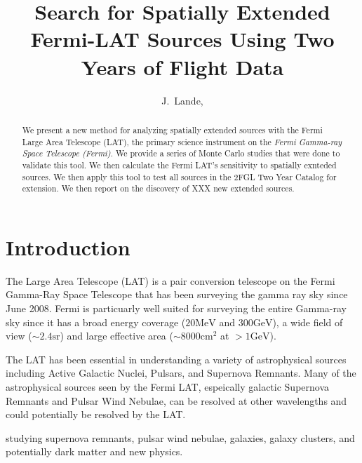 \documentclass[preprint]{aastex}
\newcommand{\mev}{\text{MeV}\xspace}
\newcommand{\gev}{\text{GeV}\xspace}
\newcommand{\sr}{\text{sr}\xspace}
\newcommand{\cm}{\text{cm}\xspace}
\begin{document}
\title{Search for Spatially Extended Fermi-LAT Sources Using Two Years of Flight
Data}

\author{
J.~Lande, 
}


\begin{abstract}
We present a new method for analyzing spatially extended sources with
the Fermi Large Area Telescope (LAT), the primary science instrument
on the {\em Fermi Gamma-ray Space Telescope (Fermi)}.  We provide a
series of Monte Carlo studies that were done to validate this tool.
We then calculate the Fermi LAT's sensitivity to spatially exnteded
sources.
We then apply this tool to test all sources in the 2FGL Two Year Catalog
for extension.\cite{2FGL} We then report on the discovery of XXX new
extended sources.
\end{abstract}

\section{Introduction}


The Large Area Telescope (LAT) is a pair conversion telescope on the
Fermi Gamma-Ray Space Telescope that has been surveying the gamma ray
sky since June 2008.  Fermi is particuarly well suited for surveying
the entire Gamma-ray sky since it has a broad energy coverage ($20\mev$
and $300\gev$), a wide field of view ($\sim 2.4 \sr$) and large effective area
($\sim 8000 \cm^2$ at $>1\gev$).

The LAT has been essential in understanding a variety of astrophysical
sources including Active Galactic Nuclei, Pulsars, and Supernova Remnants.
Many of the astrophysical sources seen by the Fermi LAT, espeically
galactic Supernova Remnants and Pulsar Wind Nebulae, can be resolved at
other wavelengths and could potentially be resolved by the LAT.

studying supernova remnants, 
pulsar wind nebulae, 
galaxies,  galaxy clusters, and potentially dark matter and new physics.
\end{document}

